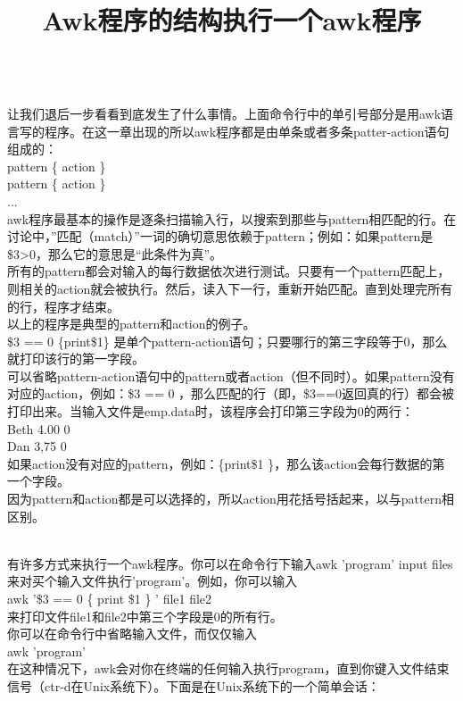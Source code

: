 \documentclass[10pt,fancyhdr,UTF-8]{ctexart}
\begin{document}
\title{\textbf{Awk程序的结构}} \\
让我们退后一步看看到底发生了什么事情。上面命令行中的单引号部分是用awk语言写的程序。在这一章出现的所以awk程序都是由单条或者多条patter-action语句组成的：\\
pattern    \{ action  \}  \\
pattern    \{ action  \}  \\
... \\
awk程序最基本的操作是逐条扫描输入行，以搜索到那些与pattern相匹配的行。在讨论中，”匹配（match）”一词的确切意思依赖于pattern；例如：如果pattern是\$3>0，那么它的意思是“此条件为真”。 \\
所有的pattern都会对输入的每行数据依次进行测试。只要有一个pattern匹配上，则相关的action就会被执行。然后，读入下一行，重新开始匹配。直到处理完所有的行，程序才结束。 \\
以上的程序是典型的pattern和action的例子。 \\
\$3 == 0 \{print\$1\} 是单个pattern-action语句；只要哪行的第三字段等于0，那么就打印该行的第一字段。 \\
可以省略pattern-action语句中的pattern或者action（但不同时）。如果pattern没有对应的action，例如：\$3 == 0 ，那么匹配的行（即，\$3==0返回真的行）都会被打印出来。当输入文件是emp.data时，该程序会打印第三字段为0的两行： \\
\indent Beth   4.00    0 \\
\indent Dan    3,75    0 \\
如果action没有对应的pattern，例如：\{print\$1 \}，那么该action会每行数据的第一个字段。 \\
因为pattern和action都是可以选择的，所以action用花括号括起来，以与pattern相区别。 \\
\indent \title{\textbf{执行一个awk程序}} \\
有许多方式来执行一个awk程序。你可以在命令行下输入awk  'program' input files来对买个输入文件执行'program'。例如，你可以输入 \\
awk  '\$3 == 0 \{ print \$1 \} '  file1  file2  \\
来打印文件file1和file2中第三个字段是0的所有行。\\
你可以在命令行中省略输入文件，而仅仅输入 \\
awk  'program' \\
在这种情况下，awk会对你在终端的任何输入执行program，直到你键入文件结束信号（ctr-d在Unix系统下）。下面是在Unix系统下的一个简单会话： \\
\end{document}

